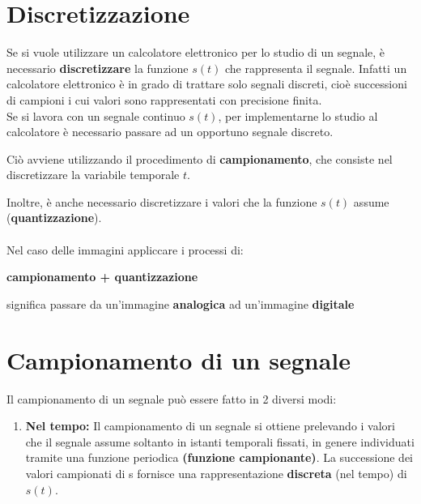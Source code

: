 \section{Discretizzazione}
Se si vuole utilizzare un calcolatore elettronico per lo studio di un
segnale, è necessario \textbf{discretizzare} la funzione $s(t)$ che rappresenta
il segnale. Infatti un calcolatore elettronico è in grado di trattare
solo segnali discreti, cioè successioni di campioni i cui valori sono
rappresentati con precisione finita.
\\Se si lavora con un segnale continuo $s(t)$, per implementarne lo
studio al calcolatore è necessario passare ad un opportuno segnale
discreto.
\begin{center}
    Ciò avviene utilizzando il procedimento di \textbf{campionamento}, che consiste nel discretizzare la variabile temporale $t$.
\end{center}
Inoltre, è anche necessario discretizzare i valori che la funzione $s(t)$
assume (\textbf{quantizzazione}).
\\\\Nel caso delle immagini appliccare i processi di:
\begin{center}
    \textbf{campionamento + quantizzazione}
\end{center}
significa passare da un'immagine \textbf{analogica} ad un'immagine \textbf{digitale}
\section{Campionamento di un segnale}
Il campionamento di un segnale può essere fatto in 2 diversi modi:
\begin{enumerate}
    \item \textbf{Nel tempo:} Il campionamento di un segnale si ottiene prelevando
          i valori che il segnale assume soltanto in istanti temporali fissati, in genere individuati tramite una funzione periodica \textbf{(funzione campionante)}.
          La successione dei valori campionati di s fornisce una rappresentazione \textbf{discreta} (nel tempo) di $s(t)$.
\end{enumerate}
